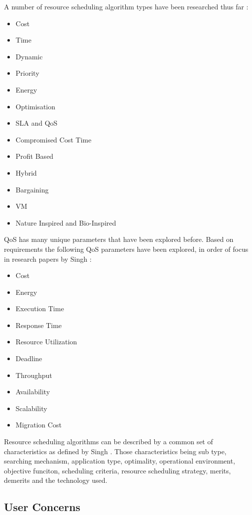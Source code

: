 \documentclass[fullapage,12pt]{article}
\begin{document}
A number of resource scheduling algorithm types have been researched thus far \cite{Singh2016}:
\begin{itemize}
    \item Cost
    \item Time
    \item Dynamic
    \item Priority
    \item Energy
    \item Optimisation
    \item SLA and QoS
    \item Compromised Cost Time
    \item Profit Based
    \item Hybrid
    \item Bargaining
    \item VM
    \item Nature Inspired and Bio-Inspired
\end{itemize}

QoS has many unique parameters that have been explored before. Based on requirements the following QoS parameters have been explored, in order of focus in research papers by Singh \cite{Singh2016}:
\begin{itemize}
    \item Cost
    \item Energy
    \item Execution Time
    \item Response Time
    \item Resource Utilization
    \item Deadline
    \item Throughput
    \item Availability
    \item Scalability
    \item Migration Cost
\end{itemize}

Resource scheduling algorithms can be described by a common set of characteristics as defined by Singh \cite{Singh2016}. Those characteristics being sub type, searching mechanism, application type, optimality, operational environment, objective funciton, scheduling criteria, resource scheduling strategy, merits, demerits and the technology used. 

\subsection{User Concerns}
\end{document}
